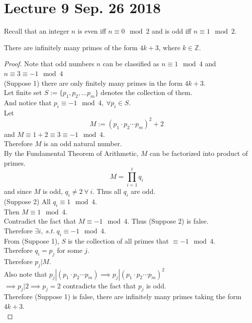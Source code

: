 \documentclass[11pt]{article}
\begin{document}
	\section{Lecture 9 Sep. 26 2018}
	\begin{remark}
		Recall that an integer $n$ is even iff $n \equiv 0 \mod 2$ and is odd iff $n \equiv 1 \mod 2$.
	\end{remark}
	
	\begin{theorem}
		There are infinitely many primes of the form $4k+3$, where $k \in \mathbb{Z}$.
	\end{theorem}
	\begin{proof}
		Note that odd numbers $n$ can be classified as $n \equiv 1 \mod 4$ and $n \equiv 3 \equiv -1\mod 4$ \\
		(Suppose 1) there are only finitely many primes in the form $4k+3$. \\
		Let finite set $S := \{p_1, p_2, \dots p_m\}$ denotes the collection of them. \\
		And notice that $p_i \equiv -1 \mod 4,\ \forall p_i \in S$. \\
		Let 
		\[
			M := (p_1 \cdot p_2 \cdots p_m)^2 + 2
		\]
		and $M \equiv 1 + 2 \equiv 3 \equiv -1 \mod 4$. \\
		Therefore $M$ is an odd natural number. \\
		By the Fundamental Theorem of Arithmetic, $M$ can be factorized into product of primes.\\
		\[
			M = \prod_{i=1}^{\ell} q_i
		\]
		and since $M$ is odd, $q_i \neq 2\ \forall \ i$. Thus all $q_i$ are odd.\\
		(Suppose 2) All $q_i \equiv 1 \mod 4$. \\
		Then $M \equiv 1 \mod 4$. \\
		Contradict the fact that $M \equiv -1 \mod 4$. Thus (Suppose 2) is false. \\
		Therefore $\exists i,\ s.t.\ q_i \equiv -1 \mod 4$. \\
		From (Suppose 1), $S$ is the collection of all primes that $\equiv -1 \mod 4$. \\
		Therefore $q_i = p_j$ for some $j$. \\
		Therefore $p_j | M$.\\
		Also note that $p_j | (p_1 \cdot p_2 \cdots p_m) \implies p_j | (p_1 \cdot p_2 \cdots p_m)^2$ \\
		$\implies p_j | 2 \implies p_j = 2$ contradicts the fact that $p_j$ is odd. \\
		Therefore (Suppose 1) is false, there are infinitely many primes taking the form $4k+3$. \\
	\end{proof}
	
\end{document}
